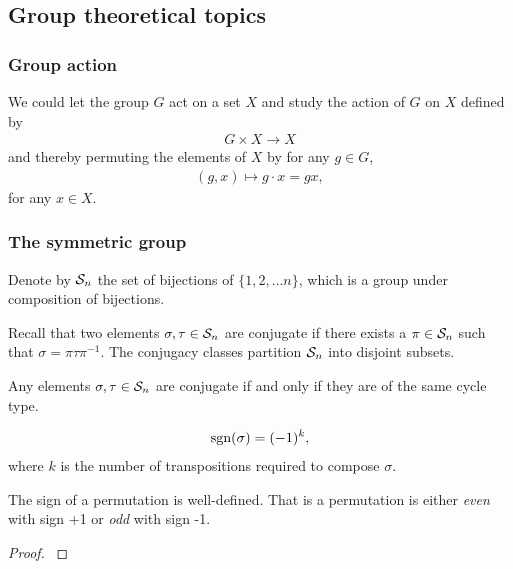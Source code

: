 	
\subsection{Group theoretical topics}

	\subsubsection{Group action}
	
		We could let the group $G$ act on a set $X$ and study the action of $G$ on $X$ defined by
		\begin{align*}
			G \times X \rightarrow X
		\end{align*}
		and thereby permuting the elements of $X$ by for any $g \in G$,
		\begin{align*}
			(g,x) \mapsto g \cdot x = gx,
		\end{align*}
		for any $x \in X$.
	
	\subsubsection{The symmetric group}
	
		Denote by $\mathcal{S}_n$ the set of bijections of $\{1, 2, \dots n\}$, which is a group under composition of bijections.
	
		Recall that two elements $\sigma, \tau \in \mathcal{S}_n$ are conjugate if there exists a $\pi \in \mathcal{S}_n$ such that $\sigma = \pi \tau \pi^{-1}$. The conjugacy classes partition $\mathcal{S}_n$ into disjoint subsets. 
		
		\begin{proposition}
			Any elements $\sigma, \tau \in \mathcal{S}_n$ are conjugate if and only if they are of the same cycle type.
		\end{proposition}
		
		\begin{definition}
			\begin{align*}
				\text{sgn}(\sigma) = (-1)^k,
			\end{align*}
			where $k$ is the number of transpositions required to compose $\sigma$.
		\end{definition}
		
		\begin{proposition}\label{prop:signwelldefined}
			The sign of a permutation is well-defined. That is a permutation is either \textit{even} with sign +1 or \textit{odd} with sign -1.
		\end{proposition}
		\begin{proof}
			\cite[Thm.12.6.1.]{Biggs}
		\end{proof}
		
		
		
